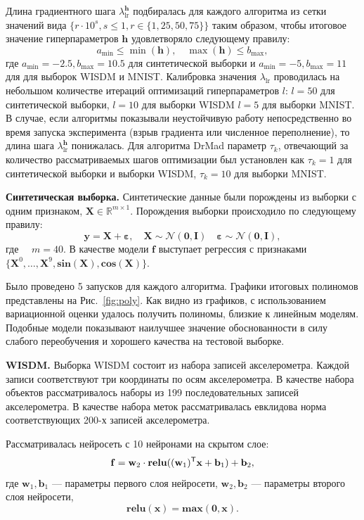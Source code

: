 Длина градиентного шага $ \lambda_{\text{lr}}^{\mathbf{h}}$ подбиралась для каждого алгоритма из сетки значений вида $\{r \cdot 10^{s}, s \leq 1, r \in \{1,25,50,75\}\}$  таким образом, чтобы итоговое значение гиперпараметров  $\mathbf{h}$  удовлетворяло следующему правилу:
\[
    a_\text{min} \leq  \min(\mathbf{h}), \quad \max(\mathbf{h}) \leq b_\text{max},
\] 
где  $a_\text{min} = -2.5, b_\text{max}=10.5$ для синтетической выборки и $a_\text{min} = -5, b_\text{max}=11$ для для выборок WISDM и MNIST.
Калибровка значения $ \lambda_{\text{lr}}$ проводилась на небольшом количестве итераций оптимизаций гиперпараметров $l$:
$l = 50$ для синтетической выборки,  $l=10$ для выборки WISDM $l=5$ для выборки MNIST. В случае, если алгоритмы показывали неустойчивую работу непосредственно во время запуска эксперимента (взрыв градиента или численное переполнение), то длина шага $ \lambda_{\text{lr}}^\mathbf{h}$ понижалась. Для алгоритма DrMad параметр $\tau_k$, отвечающий за количество рассматриваемых шагов оптимизации был установлен как $\tau_k=1$ для синтетической выборки и выборки WISDM, $\tau_k=10$ для выборки MNIST.



\textbf{Синтетическая выборка. }
Синтетические данные были порождены из выборки с одним признаком, $\mathbf{X} \in \mathbb{R}^{m \times 1}$.
Порождения выборки происходило по следующему правилу:
\[
	\mathbf{y} = \mathbf{X} + \boldsymbol{\varepsilon},\quad \mathbf{X}  \sim \mathcal{N}(\mathbf{0}, \mathbf{I}) \quad \boldsymbol{\varepsilon} \sim \mathcal{N}(\mathbf{0}, \mathbf{I}),
\]
где $\quad m = 40.$
В качестве модели $\mathbf{f}$ выступает регрессия с признаками $\{\mathbf{X}^0, \dots, \mathbf{X}^9, \textbf{sin}(\mathbf{X}), \textbf{cos}(\mathbf{X})\}$.

Было проведено 5 запусков для каждого алгоритма.
Графики итоговых полиномов представлены на Рис.~\ref{fig:poly}. Как видно из графиков, с использованием вариационной оценки удалось получить полиномы, близкие к линейным моделям. Подобные модели показывают наилучшее значение обоснованности в силу слабого переобучения и хорошего качества на тестовой выборке. 


\textbf{WISDM. }
Выборка WISDM состоит из набора записей акселерометра. Каждой записи соответствуют три координаты по осям акселерометра. В качестве набора объектов рассматривалось наборы из 199 последовательных записей акселерометра. В качестве набора меток рассматривалась евклидова норма соответствующих 200-х записей акселерометра.

Рассматривалась нейросеть с 10 нейронами на скрытом слое:
\[
    \mathbf{f} = \mathbf{w}_2 \cdot \textbf{relu}((\mathbf{w}_1)^{\mathsf{T}}\mathbf{x} + \mathbf{b}_1) +\mathbf{b}_2,
\]
где $\mathbf{w}_1, \mathbf{b}_1$ --- параметры первого слоя нейросети,
$\mathbf{w}_2, \mathbf{b}_2$ --- параметры второго слоя нейросети,
\[
    \textbf{relu}(\mathbf{x}) = \textbf{max}(\mathbf{0}, \mathbf{x}).
\]


